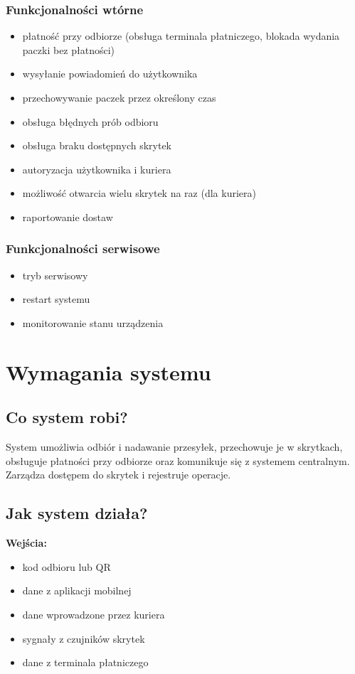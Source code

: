 \documentclass[a4paper,12pt]{article}
\begin{document}
\subsubsection{Funkcjonalności wtórne}
\begin{itemize}
  \item płatność przy odbiorze (obsługa terminala płatniczego, blokada wydania paczki bez płatności)
  \item wysyłanie powiadomień do użytkownika
  \item przechowywanie paczek przez określony czas
  \item obsługa błędnych prób odbioru
  \item obsługa braku dostępnych skrytek
  \item autoryzacja użytkownika i kuriera
  \item możliwość otwarcia wielu skrytek na raz (dla kuriera)
  \item raportowanie dostaw
\end{itemize}

\subsubsection{Funkcjonalności serwisowe}
\begin{itemize}
  \item tryb serwisowy
  \item restart systemu
  \item monitorowanie stanu urządzenia
\end{itemize}

\section{Wymagania systemu}

\subsection{Co system robi?}
System umożliwia odbiór i nadawanie przesyłek, przechowuje je w skrytkach,
obsługuje płatności przy odbiorze oraz komunikuje się z systemem centralnym.
Zarządza dostępem do skrytek i rejestruje operacje.

\subsection{Jak system działa?}

\noindent\textbf{Wejścia:}
\begin{itemize}
  \item kod odbioru lub QR
  \item dane z aplikacji mobilnej
  \item dane wprowadzone przez kuriera
  \item sygnały z czujników skrytek
  \item dane z terminala płatniczego
\end{itemize}
\end{document}
